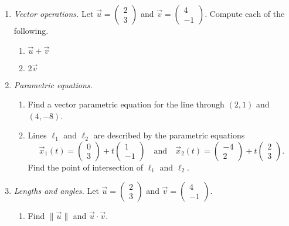 \begin{enumerate}
\item \emph{Vector operations.} Let $\vec{u} = \begin{pmatrix} 2 \\ 3 \end{pmatrix}$ and $\vec{v} = \begin{pmatrix} 4 \\ -1 \end{pmatrix}$. Compute each of the following.
\begin{enumerate}
\item $\vec{u} + \vec{v}$
\item $2\vec{v}$
\end{enumerate}
\item \emph{Parametric equations.}
\begin{enumerate}
\item Find a vector parametric equation for the line through $(2,1)$ and $(4,-8)$.
\item Lines $\ell_1$ and $\ell_2$ are described by the parametric equations
\begin{equation*}
\vec{x}_1(t) = \begin{pmatrix} 0 \\ 3 \end{pmatrix} + t\begin{pmatrix} 1 \\ -1 \end{pmatrix}\quad\text{and}\quad\vec{x}_2(t) = \begin{pmatrix} -4 \\ 2 \end{pmatrix} + t\begin{pmatrix} 2 \\ 3 \end{pmatrix}.
\end{equation*}
Find the point of intersection of $\ell_1$ and $\ell_2$.
\end{enumerate}
\item \emph{Lengths and angles.} Let $\vec{u} = \begin{pmatrix} 2 \\ 3 \end{pmatrix}$ and $\vec{v} = \begin{pmatrix} 4 \\ -1 \end{pmatrix}$.
\begin{enumerate}
\item Find $\|\vec{u}\|$ and $\vec{u}\cdot\vec{v}$.

\end{enumerate}
\end{enumerate}
